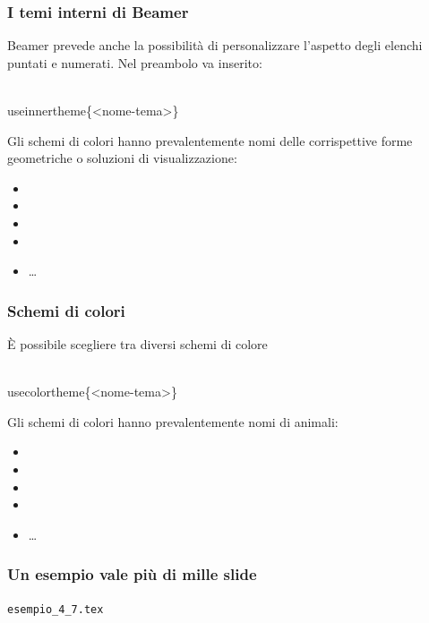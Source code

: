 \documentclass[svgnames,%
	ucs,%
	pdftex]{guitbeamer}
\begin{document}
\begin{frame}
  \frametitle{I temi interni di Beamer}
	Beamer prevede anche la possibilit\`a di personalizzare l'aspetto degli elenchi puntati e numerati. Nel preambolo va inserito:
	\begin{LaTeXcode}
		\\useinnertheme\{\alert{<nome-tema>}\}
	\end{LaTeXcode}
	Gli schemi di colori hanno prevalentemente nomi delle corrispettive forme geometriche o soluzioni di visualizzazione:
	\begin{itemize}
		\item {}
		\item {}
		\item {}
		\item {}
		\item \dots
	\end{itemize}
\end{frame}
\begin{frame}
  \frametitle{Schemi di colori}
	\`E possibile scegliere tra diversi schemi di colore
	\begin{LaTeXcode}
		\\usecolortheme\{\alert{<nome-tema>}\}
	\end{LaTeXcode}
	Gli schemi di colori hanno prevalentemente nomi di animali:
	\begin{itemize}
		\item {}
		\item {}
		\item {}
		\item {}
		\item \dots
	\end{itemize}
\end{frame}
\begin{frame}
  \frametitle{Un esempio vale pi\`u di mille slide}
	\begin{center}
		\alert{\texttt{esempio\_4\_7.tex}}
	\end{center}
\end{frame}
\end{document}
